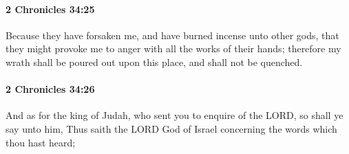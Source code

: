 		\paragraph{2 Chronicles 34:25} %
			\label{2CHRONICLES-34-25}

			Because they have forsaken me, and have burned incense unto other gods, that they might provoke me to anger with all the works of their hands; therefore my wrath shall be poured out upon this place, and shall not be quenched.


		\paragraph{2 Chronicles 34:26} %
			\label{2CHRONICLES-34-26}

			And as for the king of Judah, who sent you to enquire of the LORD, so shall ye say unto him, Thus saith the LORD God of Israel concerning the words which thou hast heard;

